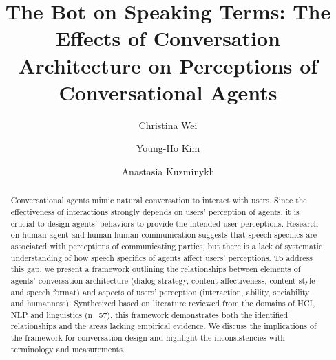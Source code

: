 \documentclass[sigconf,screen]{config/acmart}
\begin{document}

\title{The Bot on Speaking Terms: The Effects of Conversation Architecture on Perceptions of Conversational Agents}

\author{Christina Wei}

\author{Young-Ho Kim}

\author{Anastasia Kuzminykh}

\renewcommand{\shortauthors}{Wei, Kim, Kuzminykh} %


\begin{abstract}
Conversational agents mimic natural conversation to interact with users. Since the effectiveness of interactions strongly depends on users’ perception of agents, it is crucial to design agents’ behaviors to provide the intended user perceptions. Research on human-agent and human-human communication suggests that speech specifics are associated with perceptions of communicating parties, but there is a lack of systematic understanding of how speech specifics of agents affect users' perceptions. To address this gap, we present a framework outlining the relationships between elements of agents’ conversation architecture (dialog strategy, content affectiveness, content style and speech format) and aspects of users’ perception (interaction, ability, sociability and humanness). Synthesized based on literature reviewed from the domains of HCI, NLP and linguistics (n=57), this framework demonstrates both the identified relationships and the areas lacking empirical evidence. We discuss the implications of the framework for conversation design and highlight the inconsistencies with terminology and measurements.
\end{abstract}
\end{document}
